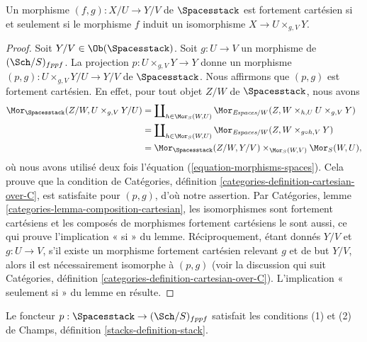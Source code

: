 \begin{lemma}
\label{lemma-spaces-strongly-cartesian}
Un morphisme $(f, g) : X/U \to Y/V$
de $\Spacesstack$ est fortement cartésien si et seulement si le
morphisme $f$ induit un isomorphisme $X \to U \times_{g, V} Y$.
\end{lemma}

\begin{proof}
Soit $Y/V \in \Ob(\Spacesstack)$.
Soit $g : U \to V$ un morphisme de $(\Sch/S)_{fppf}$.
La projection $p : U \times_{g, V} Y \to Y$
donne un morphisme
$(p, g) : U \times_{g, V} Y/U \to Y/V$ de $\Spacesstack$.
Nous affirmons que $(p, g)$ est fortement cartésien.
En effet, pour tout objet $Z/W$ de $\Spacesstack$, nous avons
\begin{align*}
\Mor_{\Spacesstack}(Z/W, U \times_{g, V} Y/U)
& =
\coprod\nolimits_{h \in \Mor_S(W, U)}
\Mor_{\textit{Espaces}/W}(Z, W \times_{h, U} U \times_{g, V} Y) \\
& =
\coprod\nolimits_{h \in \Mor_S(W, U)}
\Mor_{\textit{Espaces}/W}(Z, W \times_{g \circ h, V} Y) \\
& =
\Mor_{\Spacesstack}(Z/W, Y/V)
\times_{\Mor_S(W, V)} \Mor_S(W, U),
\end{align*}
où nous avons utilisé deux fois l'équation (\ref{equation-morphisms-spaces}).
Cela prouve que la condition de
Catégories, définition \ref{categories-definition-cartesian-over-C},
est satisfaite pour $(p, g)$, d'où notre assertion. Par
Catégories, lemme \ref{categories-lemma-composition-cartesian},
les isomorphismes sont fortement cartésiens et
les composés de morphismes fortement cartésiens le sont aussi,
ce qui prouve l'implication « si » du lemme. Réciproquement,
étant donnés $Y/V$ et $g : U \to V$, s'il existe un
morphisme fortement cartésien relevant $g$ et de but $Y/V$,
alors il est nécessairement isomorphe à $(p, g)$ (voir la discussion qui suit
Catégories, définition \ref{categories-definition-cartesian-over-C}).
L'implication « seulement si » du lemme en résulte.
\end{proof}

\begin{lemma}
\label{lemma-pre-stack-of-spaces}
Le foncteur $p : \Spacesstack \to (\Sch/S)_{fppf}$
satisfait les conditions (1) et (2) de
Champs, définition \ref{stacks-definition-stack}.
\end{lemma}


